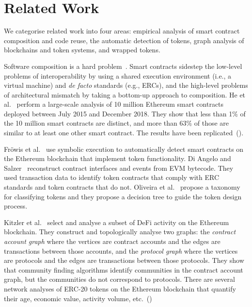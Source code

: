 \section{Related Work}\label{sec:related-work}

We categorise related work into four areas: empirical analysis of
smart contract composition and code reuse, the automatic detection of
tokens, graph analysis of blockchains and token systems, and wrapped
tokens.

Software composition is a hard problem~\cite{garlan-et-al-94}.  Smart
contracts sidestep the low-level problems of interoperability by using
a shared execution environment (i.e., a virtual machine) and
\textit{de facto} standards (e.g., ERCs), and the high-level problems
of architectural mismatch by taking a bottom-up approach to
composition.  He et al.~\cite{he-et-al-20} perform a large-scale
analysis of \num{10} million Ethereum smart contracts deployed between
July 2015 and December 2018.  They show that less than \num{1}\% of
the \num{10} million smart contracts are distinct, and more than
\num{63}\% of those are similar to at least one other smart contract.
The results have been
replicated~(\hspace{1sp}\cite{kondo-et-al-20,chen-et-al-21,khan-et-al-22}).

Fr\"owis et al.~\cite{frowis-et-al-19} use symbolic execution to
automatically detect smart contracts on the Ethereum blockchain that
implement token functionality.  Di Angelo and
Salzer~\cite{di-angelo-salzer-21} reconstruct contract interfaces and
events from EVM bytecode.  They used transaction data to identify
token contracts that comply with ERC standards and token contracts
that do not.  Oliveira et al.~\cite{oliveira-et-al-18} propose a
taxonomy for classifying tokens and they propose a decision tree to
guide the token design process.

Kitzler et al.~\cite{kitzler-et-al-21} select and analyse a subset of
DeFi activity on the Ethereum blockchain.  They construct and
topologically analyse two graphs: the \textit{contract account graph}
where the vertices are contract accounts and the edges are
transactions between those accounts, and the \textit{protocol graph}
where the vertices are protocols and the edges are transactions
between those protocols.  They show that community finding algorithms
identify communities in the contract account graph, but the
communities do not correspond to protocols.  There are several network
analyses of ERC-20 tokens on the Ethereum blockchain that quantify
their age, economic value, activity volume,
etc.~(\hspace{1sp}\cite{somin-et-al-18,victor-luders-19})

